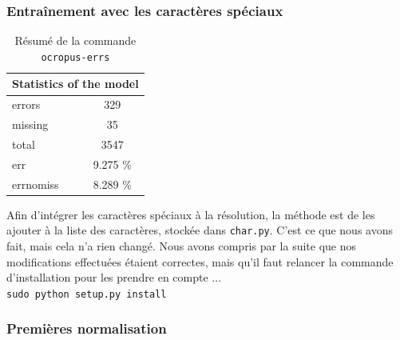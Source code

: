 \documentclass{article}
\begin{document}
\subsubsection{Entraînement avec les caractères spéciaux}
\begin{table}[!h]
    \centering
    \begin{tabular}{|l|l|lc|l|l|}
        \hline
        \multicolumn{6}{|c|}{\cellcolor[gray]{0.8}Statistics of the model}                   \\ \hline
        \multicolumn{3}{|l|}{errors}    & \multicolumn{3}{c|}{329}      \\ \hline
        \multicolumn{3}{|l|}{missing}   & \multicolumn{3}{c|}{35}       \\ \hline
        \multicolumn{3}{|l|}{total}     & \multicolumn{3}{c|}{3547}     \\ \hline
        \multicolumn{3}{|l|}{err}       & \multicolumn{3}{c|}{9.275 \%} \\ \hline
        \multicolumn{3}{|l|}{errnomiss} & \multicolumn{3}{c|}{8.289 \%} \\ \hline
    \end{tabular}
    \caption{Résumé de la commande \texttt{ocropus-errs}}
    \label{t1}
\end{table}

Afin d'intégrer les caractères spéciaux à la résolution, la méthode est de les ajouter à la liste des caractères, stockée dans \texttt{char.py}. C'est ce que nous avons fait, mais cela n'a rien changé. Nous avons compris par la suite que nos modifications effectuées étaient correctes, mais qu'il faut relancer la commande d'installation pour les prendre en compte ... \\
\texttt{sudo python setup.py install} \\

\subsubsection{Premières normalisation}
\end{document}
